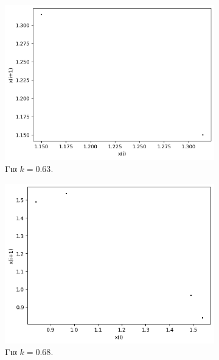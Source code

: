 \begin{figure}[h!]
\begin{subfigure}[b]{0.4\textwidth}
		\includegraphics[width=\textwidth]{LateX images/graphs q12/g5}
		\caption{Για $k=0.63$.}
		\label{f:k61}
	\end{subfigure}
	\hfill
	\begin{subfigure}[b]{0.4\textwidth}
		\centering
		\includegraphics[width=\textwidth]{LateX images/graphs q12/g6}
		\caption{Για $k=0.68$.}
		\label{f:k62}
	\end{subfigure}
	\hfill
	\begin{subfigure}[b]{0.4\textwidth}
		\centering

\end{subfigure}
\end{figure}
